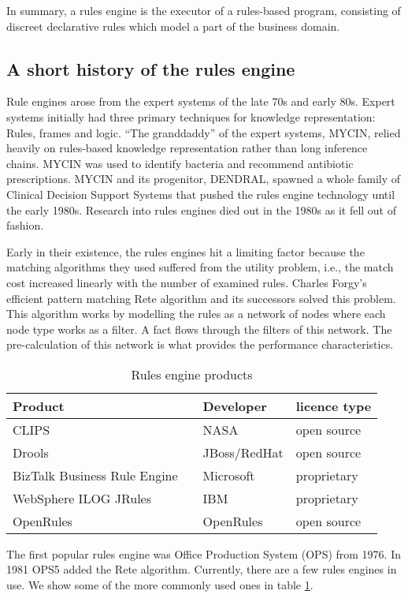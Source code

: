 In summary, a rules engine is the executor of a rules-based program, consisting of discreet declarative rules which model a part of the business domain.

\subsection{A short history of the rules engine}
\label{section:rules_engine_history}

Rule engines arose from the expert systems of the late 70s and early 80s.
Expert systems initially had three primary techniques for knowledge representation: Rules, frames and logic\cite{jackson1986introduction}.
``The granddaddy'' of the expert systems, MYCIN, relied heavily on rules-based knowledge representation\cite{shortliffe1974mycin} rather than long inference chains.
MYCIN was used to identify bacteria and recommend antibiotic prescriptions.
MYCIN and its progenitor, DENDRAL, spawned a whole family of Clinical Decision Support Systems that pushed the rules engine technology until the early 1980s.
Research into rules engines died out in the 1980s as it fell out of fashion.

Early in their existence, the rules engines hit a limiting factor because the matching algorithms they used suffered from the utility problem, i.e., the match cost increased linearly with the number of examined rules.
Charles Forgy's efficient pattern matching Rete algorithm\cite{forgy1989rete} and its successors solved this problem.
This algorithm works by modelling the rules as a network of nodes where each node type works as a filter.
A fact flows through the filters of this network.
The pre-calculation of this network is what provides the performance characteristics.

\begin{table}
    \begin{center}
        \begin{tabular}{ |l c |l|l| } 
            \hline
            Product                      &                             & Developer    & licence type   \\
            \hline
            CLIPS                        &\cite{CLIPSProductPage}      & NASA         & open source    \\ 
            Drools                       &\cite{DroolsProductPage}     & JBoss/RedHat & open source    \\ 
            BizTalk Business Rule Engine &\cite{BiztalkProductPage}    & Microsoft    & proprietary    \\ 
            WebSphere ILOG JRules        &\cite{JRulesProductPage}     & IBM          & proprietary    \\ 
            OpenRules                    &\cite{OpenRulesProductPage}  & OpenRules    & open source    \\ 
            \hline
        \end{tabular}
    \end{center}
    \caption{Rules engine products}
    \label{table:RuleEngines}
\end{table}

The first popular rules engine was Office Production System (OPS) from 1976.
In 1981 OPS5 added the Rete algorithm.
Currently, there are a few rules engines in use.
We show some of the more commonly used ones in table \ref{table:RuleEngines}.



